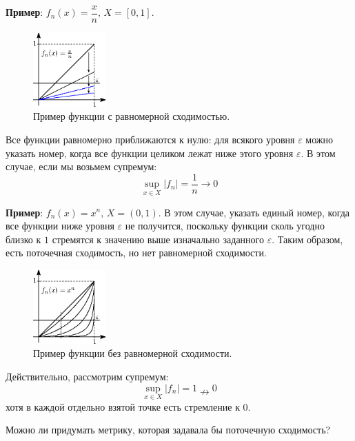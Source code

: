 \documentclass[12pt]{article}
\newcommand{\VE}{\varepsilon}
\theoremstyle{definition}
\begin{document}
\textbf{Пример}: $f_n(x) = \dfrac{x}{n}, \, X = [0,1]$.
\begin{figure}[H]
	\centering
	\includegraphics[width=0.25\textwidth]{5_1.eps}
	\caption{Пример функции с равномерной сходимостью.}
	\label{5_1}
\end{figure}
Все функции равномерно приближаются к нулю: для всякого уровня $\VE$ можно указать номер, когда все функции целиком лежат ниже этого уровня $\VE$. В этом случае, если мы возьмем супремум: 
$$\sup\limits_{x \in X}|f_n| = \dfrac{1}{n} \to 0$$

\textbf{Пример}: $f_n(x) = x^n, \, X = (0,1)$. В этом случае, указать единый номер, когда все функции ниже уровня $\VE$ не получится, поскольку функции сколь угодно близко к $1$ стремятся к значению выше изначально заданного $\VE$. Таким образом, есть поточечная сходимость, но нет равномерной сходимости.
\begin{figure}[H]
	\centering
	\includegraphics[width=0.25\textwidth]{5_2.eps}
	\caption{Пример функции без равномерной сходимости.}
	\label{5_2}
\end{figure}
Действительно, рассмотрим супремум: 
$$\sup\limits_{x \in X}|f_n| = 1 \nrightarrow 0$$ 
хотя в каждой отдельно взятой точке есть стремление к $0$.

Можно ли придумать метрику, которая задавала бы поточечную сходимость?
\end{document}
